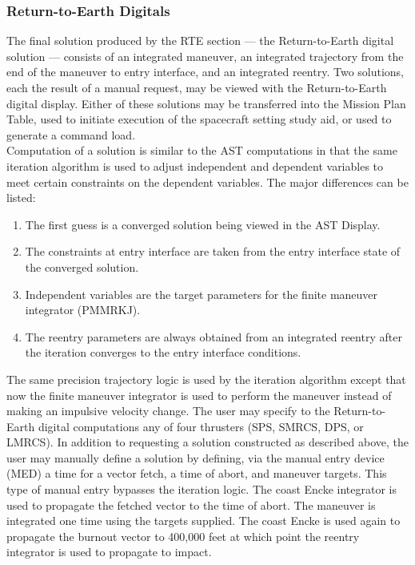 \documentclass[11pt]{article} %
\begin{document}
\subsubsection{Return-to-Earth Digitals}

The final solution produced by the RTE section — the Return-to-Earth digital solution — consists of an integrated maneuver, an integrated trajectory from the
end of the maneuver to entry interface, and an integrated reentry. Two solutions, each the result of a manual request, may be viewed with the Return-to-Earth
digital display. Either of these solutions may be transferred into the Mission Plan Table, used to initiate execution of the spacecraft setting study aid, or used to generate a command load.\\
Computation of a solution is similar to the AST computations in that the same iteration algorithm is used to adjust independent and dependent variables to meet
certain constraints on the dependent variables. The major differences can be listed:

\begin{enumerate}
	\item The first guess is a converged solution being viewed in the AST Display.
	\item The constraints at entry interface are taken from the entry interface state of the converged solution.
	\item Independent variables are the target parameters for the finite maneuver integrator (PMMRKJ).
	\item The reentry parameters are always obtained from an integrated reentry after the iteration converges to the entry interface conditions.
\end{enumerate}
The same precision trajectory logic is used by the iteration algorithm except that now the finite maneuver integrator is used to perform the maneuver instead of
making an impulsive velocity change. The user may specify to the Return-to-Earth digital computations any of four thrusters (SPS, SMRCS, DPS, or LMRCS).
In addition to requesting a solution constructed as described above, the user may manually define a solution by defining, via the manual entry device (MED) a time
for a vector fetch, a time of abort, and maneuver targets. This type of manual entry bypasses the iteration logic. The coast Encke integrator is used to propagate the fetched vector to the time of abort. The maneuver is integrated one time using the targets supplied. The coast Encke is used again to propagate the burnout vector to 400,000 feet at which point the reentry integrator is used to propagate to impact.
\end{document}
